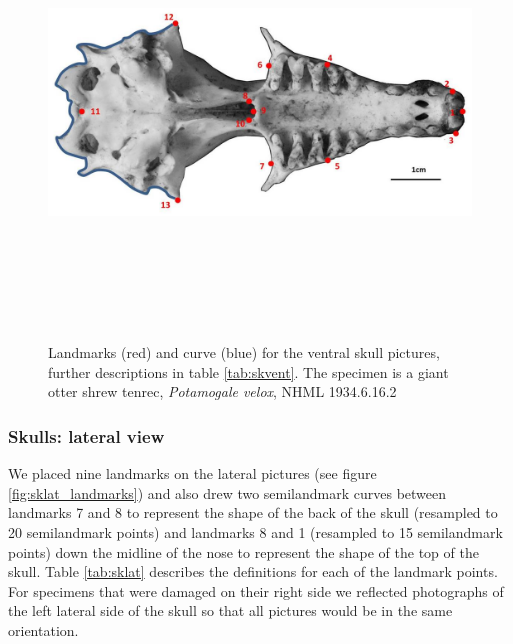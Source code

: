 \documentclass[12pt,a4paper]{article}
\begin{document}
	\begin{figure}[H] 
 	\centering
  	\includegraphics[width=12cm, height=12cm, keepaspectratio=true]
  	{figures/skvent_landmarks_pot_vel.jpg}
    \caption {Landmarks (red) and curve (blue) for the ventral skull pictures, further descriptions in table \ref{tab:skvent}. The specimen is a giant otter shrew tenrec, \textit{Potamogale velox}, NHML 1934.6.16.2}
  	\label{fig:skvent_landmarks}
  	\end{figure}


	\begin{table}[h]
	\caption{Descriptions of the landmarks (points) and curves (semilandmarks) for the skulls in ventral view (see Figure \ref{fig:skvent_landmarks}.} 
	
	\label{tab:skvent}
	\end{table}
	
\subsubsection{Skulls: lateral view}
	We placed nine landmarks on the lateral pictures (see figure \ref{fig:sklat_landmarks}) and also drew two semilandmark curves between landmarks 7 and 8 to represent the shape of the back of the skull (resampled to 20 semilandmark points) and landmarks 8 and 1 (resampled to 15 semilandmark points) down the midline of the nose to represent the shape of the top of the skull. Table \ref{tab:sklat} describes the definitions for each of the landmark points. 
	For specimens that were damaged on their right side we reflected photographs of the left lateral side of the skull so that all pictures would be in the same orientation.
\end{document}
